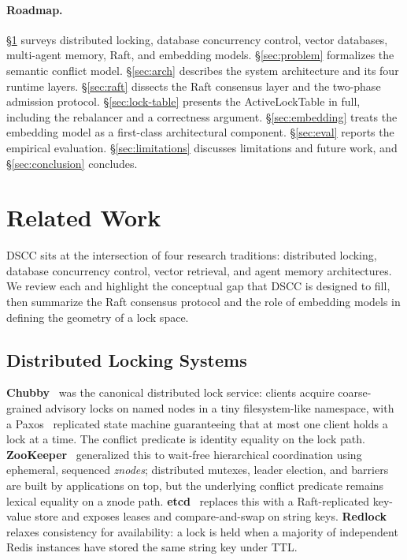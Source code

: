 \documentclass[sigconf]{acmart}
\begin{document}
\paragraph{Roadmap.}
\S\ref{sec:background} surveys distributed locking, database concurrency
control, vector databases, multi-agent memory, Raft, and embedding models.
\S\ref{sec:problem} formalizes the semantic conflict model.
\S\ref{sec:arch} describes the system architecture and its four runtime
layers. \S\ref{sec:raft} dissects the Raft consensus layer and the two-phase
admission protocol. \S\ref{sec:lock-table} presents the ActiveLockTable in
full, including the rebalancer and a correctness argument.
\S\ref{sec:embedding} treats the embedding model as a first-class
architectural component. \S\ref{sec:eval} reports the empirical evaluation.
\S\ref{sec:limitations} discusses limitations and future work, and
\S\ref{sec:conclusion} concludes.

\section{Related Work}
\label{sec:background}

DSCC sits at the intersection of four research traditions: distributed
locking, database concurrency control, vector retrieval, and agent memory
architectures. We review each and highlight the conceptual gap that DSCC is
designed to fill, then summarize the Raft consensus protocol and the role of
embedding models in defining the geometry of a lock space.

\subsection{Distributed Locking Systems}
\label{sec:bg-locking}

\textbf{Chubby}~\cite{chubby} was the canonical distributed lock service:
clients acquire coarse-grained advisory locks on named nodes in a tiny
filesystem-like namespace, with a Paxos~\cite{paxos} replicated state
machine guaranteeing that at most one client holds a lock at a time. The
conflict predicate is identity equality on the lock path.
\textbf{ZooKeeper}~\cite{zookeeper} generalized this to wait-free hierarchical
coordination using ephemeral, sequenced \emph{znodes}; distributed mutexes,
leader election, and barriers are built by applications on top, but the
underlying conflict predicate remains lexical equality on a znode path.
\textbf{etcd}~\cite{etcd} replaces this with a Raft-replicated key-value
store and exposes leases and compare-and-swap on string keys.
\textbf{Redlock}~\cite{redlock} relaxes consistency for availability: a lock
is held when a majority of independent Redis instances have stored the
same string key under TTL.
\end{document}
